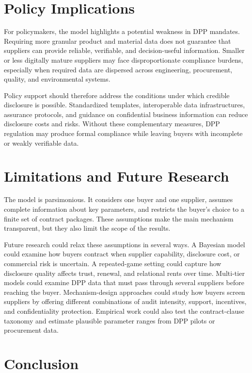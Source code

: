 \documentclass[final,5p,times,authoryear]{elsarticle}
\begin{document}
\section{Policy Implications}

For policymakers, the model highlights a potential weakness in DPP mandates. Requiring more granular product and material data does not guarantee that suppliers can provide reliable, verifiable, and decision-useful information. Smaller or less digitally mature suppliers may face disproportionate compliance burdens, especially when required data are dispersed across engineering, procurement, quality, and environmental systems.

Policy support should therefore address the conditions under which credible disclosure is possible. Standardized templates, interoperable data infrastructures, assurance protocols, and guidance on confidential business information can reduce disclosure costs and risks. Without these complementary measures, DPP regulation may produce formal compliance while leaving buyers with incomplete or weakly verifiable data.

\section{Limitations and Future Research}

The model is parsimonious. It considers one buyer and one supplier, assumes complete information about key parameters, and restricts the buyer's choice to a finite set of contract packages. These assumptions make the main mechanism transparent, but they also limit the scope of the results.

Future research could relax these assumptions in several ways. A Bayesian model could examine how buyers contract when supplier capability, disclosure cost, or commercial risk is uncertain. A repeated-game setting could capture how disclosure quality affects trust, renewal, and relational rents over time. Multi-tier models could examine DPP data that must pass through several suppliers before reaching the buyer. Mechanism-design approaches could study how buyers screen suppliers by offering different combinations of audit intensity, support, incentives, and confidentiality protection. Empirical work could also test the contract-clause taxonomy and estimate plausible parameter ranges from DPP pilots or procurement data.

\section{Conclusion}
\end{document}
